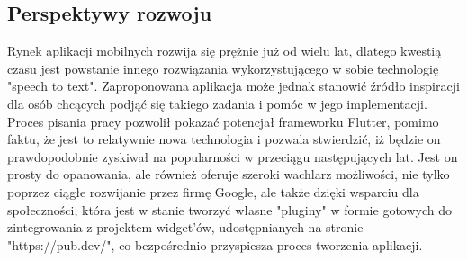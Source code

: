 \documentclass[12pt, a4paper]{article}
\begin{document}
\begin{sloppypar}
{  \subsection{Perspektywy rozwoju}
  {
  Rynek aplikacji mobilnych rozwija się prężnie już od wielu lat, dlatego kwestią czasu
  jest powstanie innego rozwiązania wykorzystującego w sobie technologię "speech to text".
  Zaproponowana aplikacja może jednak stanowić źródło inspiracji dla osób chcących podjąć
  się takiego zadania i pomóc w jego implementacji. Proces pisania pracy pozwolił pokazać
  potencjał frameworku Flutter, pomimo faktu, że jest to relatywnie nowa technologia i
  pozwala stwierdzić, iż będzie on prawdopodobnie zyskiwał na popularności w przeciągu
  następujących lat. Jest on prosty do opanowania, ale również oferuje szeroki wachlarz
  możliwości, nie tylko poprzez ciągłe rozwijanie przez firmę Google, ale także dzięki
  wsparciu dla społeczności, która jest w stanie tworzyć własne "pluginy" w formie
  gotowych do zintegrowania z projektem widget'ów, udostępnianych na stronie
  "https://pub.dev/", co bezpośrednio przyspiesza proces tworzenia aplikacji.
  }
}
\listoffigures

\printbibliography[
heading=bibintoc,
title={Bibliografia}
]


\end{sloppypar}
\end{document}
